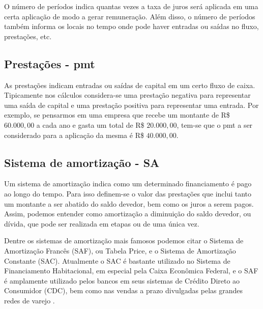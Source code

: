 O número de períodos indica quantas vezes a taxa de juros será aplicada em uma certa aplicação de modo a gerar remuneração. Além disso, o número de períodos também informa os locais no tempo onde pode haver entradas ou saídas no fluxo, prestações, etc.

\subsection{Prestações - pmt}

As prestações indicam entradas ou saídas de capital em um certo fluxo de caixa. Tipicamente nos cálculos considera-se uma prestação negativa para representar uma saída de capital e uma prestação positiva para representar uma entrada. Por exemplo, se pensarmos em uma empresa que recebe um montante de R\$ $60.000,00$ a cada ano e gasta um total de R\$ $20.000,00$, tem-se que o pmt a ser considerado para a aplicação da mesma é R\$ $40.000,00$.


\subsection{Sistema de amortização - SA}

Um sistema de amortização indica como um determinado financiamento é pago ao longo do tempo. Para isso definem-se o valor das prestações que inclui tanto um montante a ser abatido do saldo devedor, bem como os juros a serem pagos. Assim, podemos entender como amortização a diminuição do saldo devedor, ou dívida, que pode ser realizada em etapas ou de uma única vez.

Dentre os sistemas de amortização mais famosos podemos citar o Sistema de Amortização Francês (SAF), ou Tabela Price, e o Sistema de Amortização Constante (SAC). Atualmente o SAC é bastante utilizado no Sistema de Financiamento Habitacional, em especial pela Caixa Econômica Federal, e o SAF é amplamente utilizado pelos bancos em seus sistemas de Crédito Direto ao Consumidor (CDC), bem como nas vendas a prazo divulgadas pelas grandes redes de varejo \cite{usoSACSAF}.

